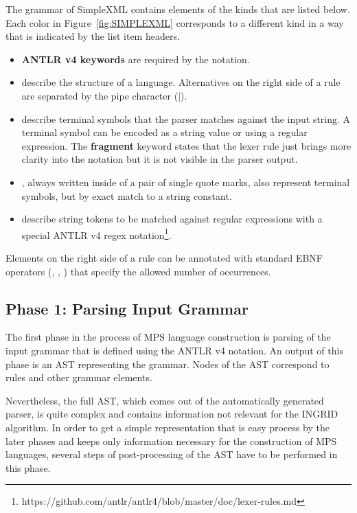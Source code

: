 The grammar of SimpleXML contains elements of the kinds that are listed below.
Each color in Figure~\ref{fig:SIMPLEXML} corresponds to a different kind in a way that is indicated by the list item headers.
\begin{itemize}
	\item \textbf{ANTLR v4 keywords} are required by the notation.
	\item {} describe the structure of a language.
		Alternatives on the right side of a rule are separated by the pipe character ($|$).
	\item {} describe terminal symbols that the parser matches against the input string.
		A terminal symbol can be encoded as a string value or using a regular expression.
		The \textbf{fragment} keyword states that the lexer rule just brings more clarity into the notation but it is not visible in the parser output.
	\item {}, always written inside of a pair of single quote marks, also represent terminal symbols, but by exact match to a string constant.
	\item {} describe string tokens to be matched against regular expressions with a special ANTLR v4 regex notation\footnote{https://github.com/antlr/antlr4/blob/master/doc/lexer-rules.md}.
\end{itemize}
Elements on the right side of a rule can be annotated with standard EBNF operators (, \code{+}, \code{*}) that specify the allowed number of occurrences.

\subsection{Phase 1: Parsing Input Grammar}

The first phase in the process of MPS language construction is parsing of the input grammar that is defined using the ANTLR v4 notation.
An output of this phase is an AST representing the grammar.
Nodes of the AST correspond to rules and other grammar elements.

Nevertheless, the full AST, which comes out of the automatically generated parser, is quite complex and contains information not relevant for the INGRID algorithm.
In order to get a simple representation that is easy process by the later phases and keeps only information necessary for the construction of MPS languages, several steps of post-processing of the AST have to be performed in this phase.


